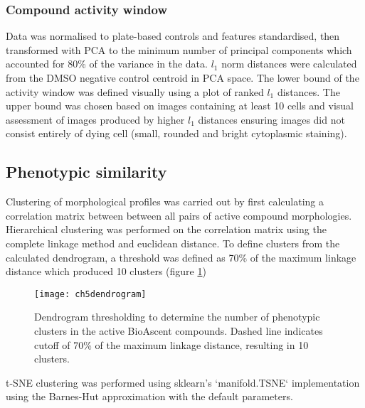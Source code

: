 \documentclass[a4paper,11pt,twoside,openright]{scrbook}
\begin{document}
\subsubsection{Compound activity window}
Data was normalised to plate-based controls and features standardised, then transformed with PCA to the minimum number 
of principal components which accounted for 80\% of the variance in the data.
$l_1$ norm distances were calculated from the DMSO negative control centroid in PCA space.
The lower bound of the activity window was defined visually using a plot of ranked $l_1$ distances.
The upper bound was chosen based on images containing at least 10 cells and visual assessment of images produced by 
higher $l_1$ distances ensuring images did not consist entirely of dying cell (small, rounded and bright cytoplasmic 
staining).


\subsection{Phenotypic similarity}
Clustering of morphological profiles was carried out by first calculating a correlation matrix between between all 
pairs of active compound morphologies.
Hierarchical clustering was performed on the correlation matrix using the complete linkage method and euclidean 
distance.
To define clusters from the calculated dendrogram, a threshold was defined as 70\% of the maximum linkage distance 
which produced 10 clusters (figure \ref{figure:dendrogram_cut})

\begin{figure}
    \captionsetup{width=0.8\textwidth}
    \caption[Dendrogram threshold to determine clusters]{
Dendrogram thresholding to determine the number of phenotypic clusters in the active BioAscent compounds.
Dashed line indicates cutoff of 70\% of the maximum linkage distance, resulting in 10 clusters.
}
    \texttt{[image: ch5dendrogram]}
    \label{figure:dendrogram_cut}
\end{figure}

t-SNE clustering was performed using sklearn's `manifold.TSNE` implementation using the Barnes-Hut approximation with 
the default parameters.
\end{document}
